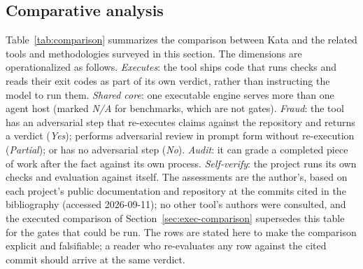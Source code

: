 \documentclass[11pt]{article}
\begin{document}
\subsection{Comparative analysis}

Table~\ref{tab:comparison} summarizes the comparison between Kata and the
related tools and methodologies surveyed in this section. The dimensions
are operationalized as follows. \emph{Executes}: the tool ships code that
runs checks and reads their exit codes as part of its own verdict, rather
than instructing the model to run them. \emph{Shared core}: one executable
engine serves more than one agent host (marked \emph{N/A} for benchmarks,
which are not gates). \emph{Fraud}: the tool has an adversarial step that
re-executes claims against the repository and returns a verdict
(\emph{Yes}); performs adversarial review in prompt form without
re-execution (\emph{Partial}); or has no adversarial step (\emph{No}).
\emph{Audit}: it can grade a completed piece of work after the fact
against its own process. \emph{Self-verify}: the project runs its own
checks and evaluation against itself. The assessments are the author's,
based on each project's public documentation and repository at the
commits cited in the bibliography (accessed 2026-09-11); no other tool's
authors were consulted, and the executed comparison of
Section~\ref{sec:exec-comparison} supersedes this table for the gates that
could be run. The rows are stated here to make the comparison explicit and
falsifiable; a reader who re-evaluates any row against the cited commit
should arrive at the same verdict.
\end{document}
